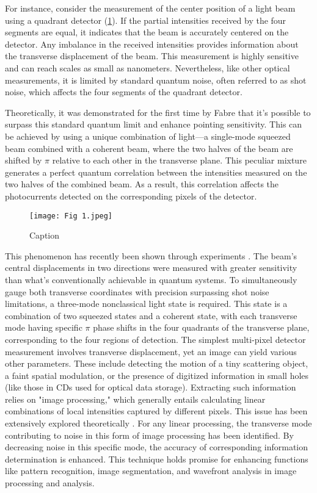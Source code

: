 \documentclass{article}
\begin{document}
For instance, consider the measurement of the center position of a light beam using a quadrant detector (\ref{f-1}). If the partial intensities received by the four segments are equal, it indicates that the beam is accurately centered on the detector. Any imbalance in the received intensities provides information about the transverse displacement of the beam. This measurement is highly sensitive and can reach scales as small as nanometers. Nevertheless, like other optical measurements, it is limited by standard quantum noise, often referred to as shot noise, which affects the four segments of the quadrant detector.

Theoretically, it was demonstrated for the first time by Fabre \cite{Fabre:00} that it's possible to surpass this standard quantum limit and enhance pointing sensitivity. This can be achieved by using a unique combination of light—a single-mode squeezed beam combined with a coherent beam, where the two halves of the beam are shifted by $\pi$ relative to each other in the transverse plane. This peculiar mixture generates a perfect quantum correlation between the intensities measured on the two halves of the combined beam. As a result, this correlation affects the photocurrents detected on the corresponding pixels of the detector.


\begin{figure}
    \centering
    \texttt{[image: Fig 1.jpeg]}
    \caption{Caption}
    \label{f-1}
\end{figure}
This phenomenon has recently been shown through experiments \cite{doi:10.1126/science.1086489}. The beam's central displacements in two directions were measured with greater sensitivity than what's conventionally achievable in quantum systems. To simultaneously gauge both transverse coordinates with precision surpassing shot noise limitations, a three-mode nonclassical light state is required. This state is a combination of two squeezed states and a coherent state, with each transverse mode having specific $\pi$ phase shifts in the four quadrants of the transverse plane, corresponding to the four regions of detection. The simplest multi-pixel detector measurement involves transverse displacement, yet an image can yield various other parameters. These include detecting the motion of a tiny scattering object, a faint spatial modulation, or the presence of digitized information in small holes (like those in CDs used for optical data storage). Extracting such information relies on "image processing," which generally entails calculating linear combinations of local intensities captured by different pixels. This issue has been extensively explored theoretically \cite{PhysRevA.71.013820}. For any linear processing, the transverse mode contributing to noise in this form of image processing has been identified. By decreasing noise in this specific mode, the accuracy of corresponding information determination is enhanced. This technique holds promise for enhancing functions like pattern recognition, image segmentation, and wavefront analysis in image processing and analysis.
\end{document}
